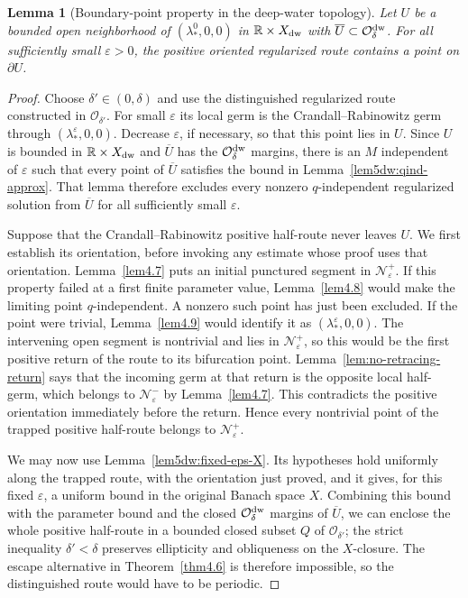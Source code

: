 \documentclass[11pt,reqno]{amsart}
\numberwithin{equation}{section}
\newtheorem{lemma}[theorem]{Lemma}
\theoremstyle{definition}
\theoremstyle{remark}
\begin{document}
\begin{lemma}[Boundary-point property in the deep-water topology]
\label{lem5.6}
Let $U$ be a bounded open neighborhood of $(\lambda_*^0,0,0)$ in
$\mathbb R\times X_{\rm dw}$ with
$\overline U\subset\mathcal O_\delta^{\rm dw}$.  For all sufficiently
small $\varepsilon>0$, the positive oriented regularized route contains
a point on $\partial U$.
\end{lemma}
\begin{proof}
Choose $\delta'\in(0,\delta)$ and use the distinguished regularized
route constructed in $\mathcal O_{\delta'}$.  For small
$\varepsilon$ its local germ is the Crandall--Rabinowitz germ through
$(\lambda_*^\varepsilon,0,0)$.  Decrease $\varepsilon$, if necessary,
so that this point lies in $U$.  Since $U$ is bounded in
$\mathbb R\times X_{\rm dw}$ and $\overline U$ has the
$\mathcal O_\delta^{\rm dw}$ margins, there is an $M$ independent of
$\varepsilon$ such that every point of $\overline U$ satisfies the
bound in Lemma~\ref{lem5dw:qind-approx}.  That lemma therefore
excludes every nonzero $q$-independent regularized solution from
$\overline U$ for all sufficiently small $\varepsilon$.

Suppose that the Crandall--Rabinowitz positive half-route never leaves
$U$.  We first establish its orientation, before invoking any estimate
whose proof uses that orientation.  Lemma~\ref{lem4.7} puts an initial
punctured segment in $\mathcal N_\varepsilon^+$.  If this property
failed at a first finite parameter value, Lemma~\ref{lem4.8} would
make the limiting point $q$-independent.  A nonzero such point has
just been excluded.  If the point were trivial, Lemma~\ref{lem4.9}
would identify it as $(\lambda_*^\varepsilon,0,0)$.  The intervening
open segment is nontrivial and lies in $\mathcal N_\varepsilon^+$,
so this would be the first positive return of the route to its
bifurcation point.  Lemma~\ref{lem:no-retracing-return} says that the
incoming germ at that return is the opposite local half-germ, which
belongs to $\mathcal N_\varepsilon^-$ by Lemma~\ref{lem4.7}.  This
contradicts the positive orientation immediately before the return.
Hence every nontrivial point of the trapped positive half-route
belongs to $\mathcal N_\varepsilon^+$.

We may now use Lemma~\ref{lem5dw:fixed-eps-X}.  Its hypotheses hold
uniformly along the trapped route, with the orientation just proved,
and it gives, for this fixed $\varepsilon$, a uniform bound in the
original Banach space $X$.  Combining this bound with the parameter
bound and the closed $\mathcal O_\delta^{\rm dw}$ margins of
$\overline U$, we can enclose the whole positive half-route in a
bounded closed subset $Q$ of $\mathcal O_{\delta'}$; the strict
inequality $\delta'<\delta$ preserves ellipticity and obliqueness on
the $X$-closure.  The escape alternative in
Theorem~\ref{thm4.6} is therefore impossible, so the distinguished
route would have to be periodic.


\end{proof}
\end{document}
